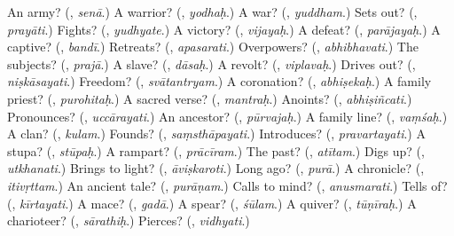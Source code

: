 \begin{tcolorbox}[breakable,colback=teal!4,colframe=teal!35!black,title={Before you move on}]
An army? (\textbf{}, \emph{senā}.) A warrior? (\textbf{}, \emph{yodhaḥ}.) A war? (\textbf{}, \emph{yuddham}.) Sets out? (\textbf{}, \emph{prayāti}.) Fights? (\textbf{}, \emph{yudhyate}.) A victory? (\textbf{}, \emph{vijayaḥ}.) A defeat? (\textbf{}, \emph{parājayaḥ}.) A captive? (\textbf{}, \emph{bandī}.) Retreats? (\textbf{}, \emph{apasarati}.) Overpowers? (\textbf{}, \emph{abhibhavati}.) The subjects? (\textbf{}, \emph{prajā}.) A slave? (\textbf{}, \emph{dāsaḥ}.) A revolt? (\textbf{}, \emph{viplavaḥ}.) Drives out? (\textbf{}, \emph{niṣkāsayati}.) Freedom? (\textbf{}, \emph{svātantryam}.) A coronation? (\textbf{}, \emph{abhiṣekaḥ}.) A family priest? (\textbf{}, \emph{purohitaḥ}.) A sacred verse? (\textbf{}, \emph{mantraḥ}.) Anoints? (\textbf{}, \emph{abhiṣiñcati}.) Pronounces? (\textbf{}, \emph{uccārayati}.) An ancestor? (\textbf{}, \emph{pūrvajaḥ}.) A family line? (\textbf{}, \emph{vaṃśaḥ}.) A clan? (\textbf{}, \emph{kulam}.) Founds? (\textbf{}, \emph{saṃsthāpayati}.) Introduces? (\textbf{}, \emph{pravartayati}.) A stupa? (\textbf{}, \emph{stūpaḥ}.) A rampart? (\textbf{}, \emph{prācīram}.) The past? (\textbf{}, \emph{atītam}.) Digs up? (\textbf{}, \emph{utkhanati}.) Brings to light? (\textbf{}, \emph{āviṣkaroti}.) Long ago? (\textbf{}, \emph{purā}.) A chronicle? (\textbf{}, \emph{itivṛttam}.) An ancient tale? (\textbf{}, \emph{purāṇam}.) Calls to mind? (\textbf{}, \emph{anusmarati}.) Tells of? (\textbf{}, \emph{kīrtayati}.) A mace? (\textbf{}, \emph{gadā}.) A spear? (\textbf{}, \emph{śūlam}.) A quiver? (\textbf{}, \emph{tūṇīraḥ}.) A charioteer? (\textbf{}, \emph{sārathiḥ}.) Pierces? (\textbf{}, \emph{vidhyati}.)
\end{tcolorbox}
